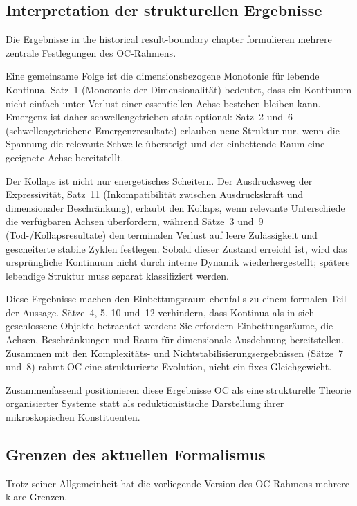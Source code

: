 \subsection{Interpretation der strukturellen Ergebnisse}

Die Ergebnisse in the historical result-boundary chapter formulieren mehrere zentrale Festlegungen des
OC-Rahmens.

Eine gemeinsame Folge ist die dimensionsbezogene Monotonie für lebende
Kontinua.
Satz~1 (Monotonie der Dimensionalität) bedeutet, dass ein Kontinuum nicht einfach
unter Verlust einer essentiellen Achse bestehen bleiben kann.
Emergenz ist daher schwellengetrieben statt optional:
Satz~2 und~6 (schwellengetriebene Emergenzresultate) erlauben neue Struktur
nur, wenn die Spannung die relevante Schwelle übersteigt und der
einbettende Raum eine geeignete Achse bereitstellt.

Der Kollaps ist nicht nur energetisches Scheitern. Der Ausdrucksweg der
Expressivität, Satz~11 (Inkompatibilität zwischen Ausdruckskraft und dimensionaler
Beschränkung), erlaubt den Kollaps, wenn relevante Unterschiede die verfügbaren
Achsen überfordern, während Sätze~3 und~9 (Tod-/Kollapsresultate) den
terminalen Verlust auf leere Zulässigkeit und gescheiterte stabile Zyklen festlegen.
Sobald dieser Zustand erreicht ist, wird das
ursprüngliche Kontinuum nicht durch interne Dynamik wiederhergestellt; spätere
lebendige Struktur muss separat klassifiziert werden.

Diese Ergebnisse machen den Einbettungsraum ebenfalls zu einem formalen Teil der
Aussage. Sätze~4, 5, 10 und~12 verhindern, dass Kontinua als in sich
geschlossene Objekte betrachtet werden: Sie erfordern Einbettungsräume, die
Achsen, Beschränkungen und Raum für dimensionale Ausdehnung bereitstellen.
Zusammen mit den Komplexitäts- und Nichtstabilisierungsergebnissen
(Sätze~7 und~8) rahmt OC eine strukturierte Evolution, nicht ein fixes
Gleichgewicht.

Zusammenfassend positionieren diese Ergebnisse OC als eine strukturelle Theorie
organisierter Systeme statt als reduktionistische Darstellung ihrer mikroskopischen
Konstituenten.

\subsection{Grenzen des aktuellen Formalismus}

Trotz seiner Allgemeinheit hat die vorliegende Version des OC-Rahmens mehrere
klare Grenzen.

